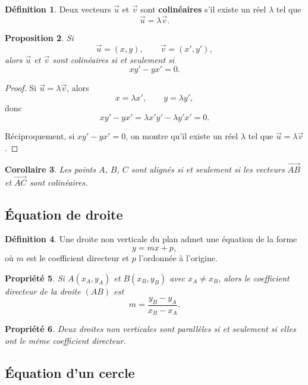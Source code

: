 \documentclass[11pt,a4paper]{article}
\newcommand{\uu}{\overrightarrow{u}}
\newcommand{\vv}{\overrightarrow{v}}
\theoremstyle{definition}
\newtheorem{definition}{Définition}[section]
\theoremstyle{plain}
\newtheorem{propriete}[definition]{Propriété}
\newtheorem{proposition}[definition]{Proposition}
\newtheorem{corollaire}[definition]{Corollaire}
\begin{document}
\begin{definition}
Deux vecteurs $\uu$ et $\vv$ sont \textbf{colinéaires} s'il existe un réel $\lambda$ tel que
\[
\uu=\lambda\vv.
\]
\end{definition}

\begin{proposition}
Si
\[
\uu=(x,y),\qquad \vv=(x',y'),
\]
alors $\uu$ et $\vv$ sont colinéaires si et seulement si
\[
xy'-yx'=0.
\]
\end{proposition}

\begin{proof}
Si $\uu=\lambda\vv$, alors
\[
x=\lambda x',\qquad y=\lambda y',
\]
donc
\[
xy'-yx'=\lambda x'y'-\lambda y'x'=0.
\]

Réciproquement, si $xy'-yx'=0$, on montre qu'il existe un réel $\lambda$ tel que $\uu=\lambda\vv$.
\end{proof}

\begin{corollaire}
Les points $A$, $B$, $C$ sont alignés si et seulement si les vecteurs $\overrightarrow{AB}$ et $\overrightarrow{AC}$ sont colinéaires.
\end{corollaire}

\subsection{Équation de droite}

\begin{definition}
Une droite non verticale du plan admet une équation de la forme
\[
y=mx+p,
\]
où $m$ est le coefficient directeur et $p$ l'ordonnée à l'origine.
\end{definition}

\begin{propriete}
Si $A(x_A,y_A)$ et $B(x_B,y_B)$ avec $x_A\neq x_B$, alors le coefficient directeur de la droite $(AB)$ est
\[
m=\frac{y_B-y_A}{x_B-x_A}.
\]
\end{propriete}

\begin{propriete}
Deux droites non verticales sont parallèles si et seulement si elles ont le même coefficient directeur.
\end{propriete}

\subsection{Équation d'un cercle}
\end{document}
